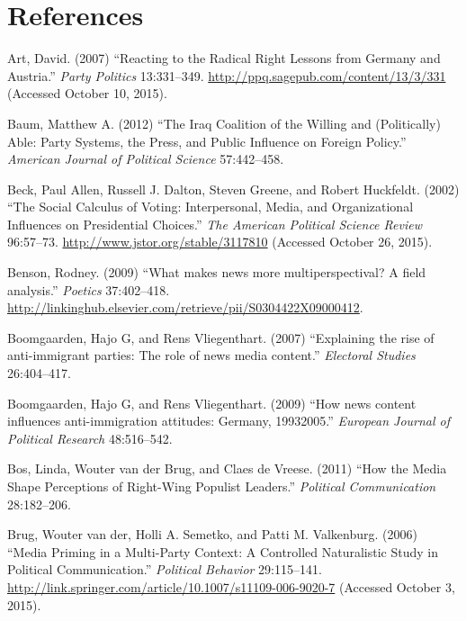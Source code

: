 \documentclass[12pt,article]{article}
\begin{document}
\pagebreak

\section{References}\label{references}

\raggedright

Art, David. (2007) ``Reacting to the Radical Right Lessons from Germany
and Austria.'' \emph{Party Politics} 13:331--349.
\url{http://ppq.sagepub.com/content/13/3/331} (Accessed October 10,
2015).

Baum, Matthew A. (2012) ``The Iraq Coalition of the Willing and
(Politically) Able: Party Systems, the Press, and Public Influence on
Foreign Policy.'' \emph{American Journal of Political Science}
57:442--458.

Beck, Paul Allen, Russell J. Dalton, Steven Greene, and Robert
Huckfeldt. (2002) ``The Social Calculus of Voting: Interpersonal, Media,
and Organizational Influences on Presidential Choices.'' \emph{The
American Political Science Review} 96:57--73.
\url{http://www.jstor.org/stable/3117810} (Accessed October 26, 2015).

Benson, Rodney. (2009) ``What makes news more multiperspectival? A field
analysis.'' \emph{Poetics} 37:402--418.
\url{http://linkinghub.elsevier.com/retrieve/pii/S0304422X09000412}.

Boomgaarden, Hajo G, and Rens Vliegenthart. (2007) ``Explaining the rise
of anti-immigrant parties: The role of news media content.''
\emph{Electoral Studies} 26:404--417.

Boomgaarden, Hajo G, and Rens Vliegenthart. (2009) ``How news content
influences anti-immigration attitudes: Germany, 19932005.''
\emph{European Journal of Political Research} 48:516--542.

Bos, Linda, Wouter van der Brug, and Claes de Vreese. (2011) ``How the
Media Shape Perceptions of Right-Wing Populist Leaders.''
\emph{Political Communication} 28:182--206.

Brug, Wouter van der, Holli A. Semetko, and Patti M. Valkenburg. (2006)
``Media Priming in a Multi-Party Context: A Controlled Naturalistic
Study in Political Communication.'' \emph{Political Behavior}
29:115--141.
\url{http://link.springer.com/article/10.1007/s11109-006-9020-7}
(Accessed October 3, 2015).
\end{document}
